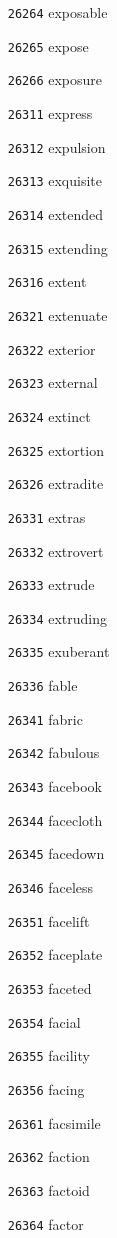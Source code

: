 \documentclass[twoside,11pt]{article}
\begin{document}
\begin{multicols}{5}
\begin{enumerate}
\item[\texttt{26264}] exposable
\item[\texttt{26265}] expose
\item[\texttt{26266}] exposure
\item[\texttt{26311}] express
\item[\texttt{26312}] expulsion
\item[\texttt{26313}] exquisite
\item[\texttt{26314}] extended
\item[\texttt{26315}] extending
\item[\texttt{26316}] extent
\item[\texttt{26321}] extenuate
\item[\texttt{26322}] exterior
\item[\texttt{26323}] external
\item[\texttt{26324}] extinct
\item[\texttt{26325}] extortion
\item[\texttt{26326}] extradite
\item[\texttt{26331}] extras
\item[\texttt{26332}] extrovert
\item[\texttt{26333}] extrude
\item[\texttt{26334}] extruding
\item[\texttt{26335}] exuberant
\item[\texttt{26336}] fable
\item[\texttt{26341}] fabric
\item[\texttt{26342}] fabulous
\item[\texttt{26343}] facebook
\item[\texttt{26344}] facecloth
\item[\texttt{26345}] facedown
\item[\texttt{26346}] faceless
\item[\texttt{26351}] facelift
\item[\texttt{26352}] faceplate
\item[\texttt{26353}] faceted
\item[\texttt{26354}] facial
\item[\texttt{26355}] facility
\item[\texttt{26356}] facing
\item[\texttt{26361}] facsimile
\item[\texttt{26362}] faction
\item[\texttt{26363}] factoid
\item[\texttt{26364}] factor

\end{enumerate}
\end{multicols}
\end{document}
